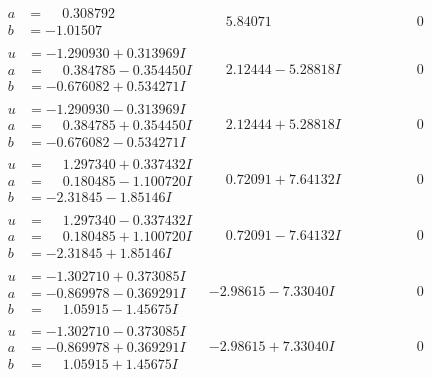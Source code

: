 \documentclass[1p]{elsarticle_modified}
\theoremstyle{definition}
\begin{document}
$$\begin{array}{c|c|c}
\begin{aligned}
a &= \phantom{-}0.308792\phantom{ +0.000000I} \\
b &= -1.01507\phantom{ +0.000000I}\end{aligned}
 & \phantom{-}5.84071\phantom{ +0.000000I} & \phantom{-0.000000 } 0 \\ \hline\begin{aligned}
u &= -1.290930 + 0.313969 I \\
a &= \phantom{-}0.384785 - 0.354450 I \\
b &= -0.676082 + 0.534271 I\end{aligned}
 & \phantom{-}2.12444 - 5.28818 I & \phantom{-0.000000 } 0 \\ \hline\begin{aligned}
u &= -1.290930 - 0.313969 I \\
a &= \phantom{-}0.384785 + 0.354450 I \\
b &= -0.676082 - 0.534271 I\end{aligned}
 & \phantom{-}2.12444 + 5.28818 I & \phantom{-0.000000 } 0 \\ \hline\begin{aligned}
u &= \phantom{-}1.297340 + 0.337432 I \\
a &= \phantom{-}0.180485 - 1.100720 I \\
b &= -2.31845 - 1.85146 I\end{aligned}
 & \phantom{-}0.72091 + 7.64132 I & \phantom{-0.000000 } 0 \\ \hline\begin{aligned}
u &= \phantom{-}1.297340 - 0.337432 I \\
a &= \phantom{-}0.180485 + 1.100720 I \\
b &= -2.31845 + 1.85146 I\end{aligned}
 & \phantom{-}0.72091 - 7.64132 I & \phantom{-0.000000 } 0 \\ \hline\begin{aligned}
u &= -1.302710 + 0.373085 I \\
a &= -0.869978 - 0.369291 I \\
b &= \phantom{-}1.05915 - 1.45675 I\end{aligned}
 & -2.98615 - 7.33040 I & \phantom{-0.000000 } 0 \\ \hline\begin{aligned}
u &= -1.302710 - 0.373085 I \\
a &= -0.869978 + 0.369291 I \\
b &= \phantom{-}1.05915 + 1.45675 I\end{aligned}
 & -2.98615 + 7.33040 I & \phantom{-0.000000 } 0 \\ \hline\begin{aligned}

\end{aligned}
\end{array}$$
\end{document}
